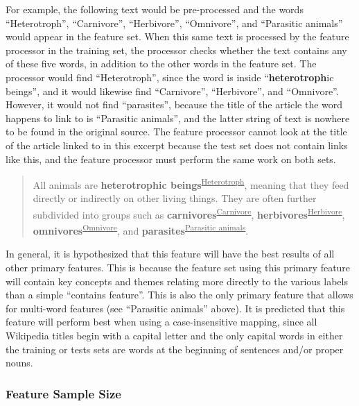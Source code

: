 For example, the following text would be pre-processed and the words ``Heterotroph'', ``Carnivore'', ``Herbivore'', ``Omnivore'', and ``Parasitic animals'' would appear in the feature set.
When this same text is processed by the feature processor in the training set, the processor checks whether the text contains any of these five words, in addition to the other words in the feature set.
The processor would find ``Heterotroph'', since the word is inside ``{\bf heterotroph}ic beings'', and it would likewise find ``Carnivore'', ``Herbivore'', and ``Omnivore''.
However, it would not find ``parasites'', because the title of the article the word happens to link to is ``Parasitic animals'', and the latter string of text is nowhere to be found in the original source.
The feature processor cannot look at the title of the article linked to in this excerpt because the test set does not contain links like this, and the feature processor must perform the same work on both sets.

\begin{quote}
All animals are {\bf heterotrophic beings}\textsuperscript{\underline{Heterotroph}}, meaning that they feed directly or indirectly on other living things. They are often further subdivided into groups such as {\bf carnivores}\textsuperscript{\underline{Carnivore}}, {\bf herbivores}\textsuperscript{\underline{Herbivore}}, {\bf omnivores}\textsuperscript{\underline{Omnivore}}, and {\bf parasites}\textsuperscript{\underline{Parasitic animals}}.
\end{quote}

In general, it is hypothesized that this feature will have the best results of all other primary features.
This is because the feature set using this primary feature will contain key concepts and themes relating more directly to the various labels than a simple ``contains feature''.
This is also the only primary feature that allows for multi-word features (see ``Parasitic animals'' above).
It is predicted that this feature will perform best when using a case-insensitive mapping, since all Wikipedia titles begin with a capital letter and the only capital words in either the training or tests sets are words at the beginning of sentences and/or proper nouns.

\subsubsection{Feature Sample Size}
\label{sec:sample-size}

